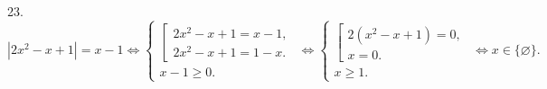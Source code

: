 23. $|2x^2-x+1|=x-1\Leftrightarrow \begin{cases} \left[\begin{array}{l}2x^2-x+1=x-1,\\ 2x^2-x+1=1-x.\end{array}\right.\\ x-1\geqslant0.\end{cases}
\Leftrightarrow \begin{cases} \left[\begin{array}{l}2(x^2-x+1)=0,\\ x=0.\end{array}\right.\\ x\geqslant1.\end{cases}\Leftrightarrow x\in\{\varnothing\}.$\\
